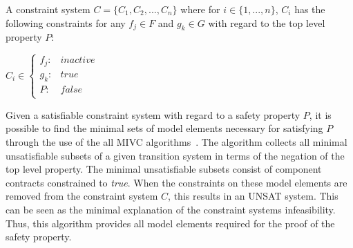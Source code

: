 \begin{definition}A constraint system $C = \{C_1,C_2,...,C_n\}$ where for $i \in \{1,...,n\}$, $C_i$ has the following constraints for any $f_j \in F$ and $g_k \in G$ with regard to the top level property $P$: 
\begin{center}
$C_i \in \left\{ \begin{array}{ll}
	f_j :&  inactive\\
	g_k :& true\\
	P :& false\\
\end{array}\right.$	
\end{center}
\label{def:constraintsystem}
\end{definition}

\begin{comment}

Given a state space $S$, a transition system $(I,T)$ consists of the initial state predicate $I : S \rightarrow \{0,1\}$ and a transition step predicate $T : S \times S \rightarrow \{0,1\}$. Reachability for $(I,T)$ is defined as the smallest predicate $R : S \rightarrow \{0,1\}$ that satisfies the following formulas:
\begin{center}
$\forall s. I(s) \Rightarrow R(s)$\\
$\forall s, s' .  R \land T(s,s') \Rightarrow R(s')$\\
\end{center}
A safety property $\mathcal{P} : S \to \{0,1\}$ is a state predicate. A safety property $\mathcal{P}$ holds on a transition system $(I,T)$ if it holds on all reachable states. More formally, $\forall s . R(s) \Rightarrow \mathcal{P}(s)$. When this is the case, we write $(I,T) \vdash\mathcal{P}$~\cite{Ghassabani2017EfficientGO}. 

\end{comment}

Given a satisfiable constraint system with regard to a safety property $P$, it is possible to find the minimal sets of model elements necessary for satisfying $P$ through the use of the all MIVC algorithms~\cite{Ghassabani2017EfficientGO,bendik2018online}. The algorithm collects all minimal unsatisfiable subsets of a given transition system in terms of the negation of the top level property. The minimal unsatisfiable subsets consist of component contracts constrained to \textit{true}. When the constraints on these model elements are removed from the constraint system $C$, this results in an UNSAT system. This can be seen as the minimal explanation of the constraint systems infeasibility. %
Thus, this algorithm provides all model elements required for the proof of the safety property. 

